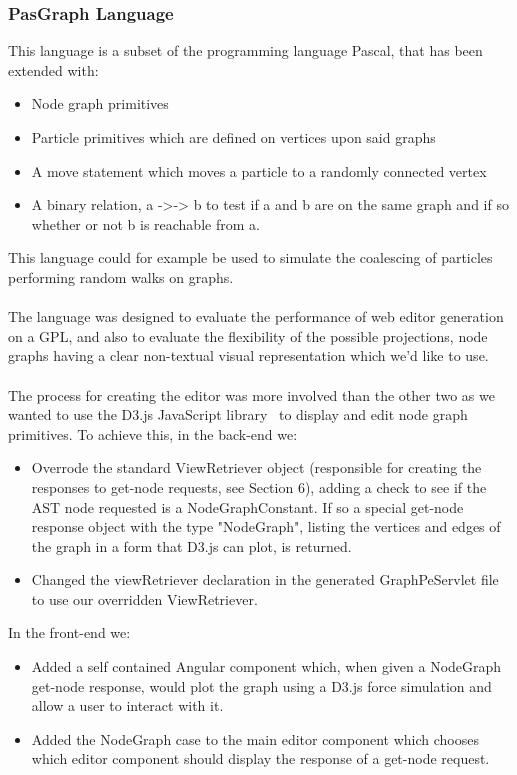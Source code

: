 \documentclass{article}
\begin{document}
{\subsubsection{PasGraph Language}\label{pasgraph}
This language is a subset of the programming language Pascal, that has been extended with: 
\begin{itemize}
\item Node graph primitives
\item Particle primitives which are defined on vertices upon said graphs
\item A move statement which moves a particle to a randomly connected vertex
\item A binary relation, a ->-> b to test if a and b are on the same graph and if so whether or not b is reachable from a.
\end{itemize}
This language could for example be used to simulate the coalescing of particles performing random walks on graphs. 
\\
\\
The language was designed to evaluate the performance of web editor generation on a GPL, and also to evaluate the flexibility of the possible projections, node graphs having a clear non-textual visual representation which we'd like to use.
\\
\\
The process for creating the editor was more involved than the other two as we wanted to use the D3.js JavaScript library~\cite{d3} to display and edit node graph primitives. To achieve this, in the back-end we:
\begin{itemize}
\item Overrode the standard ViewRetriever object (responsible for creating the responses to get-node requests, see Section 6), adding a check to see if the AST node requested is a NodeGraphConstant. If so a special get-node response object with the type "NodeGraph", listing the vertices and edges of the graph in a form that D3.js can plot, is returned. 
\item Changed the viewRetriever declaration in the  generated GraphPeServlet file to use our overridden ViewRetriever.
\end{itemize}
In the front-end we:
\begin{itemize}
\item Added a self contained Angular component which, when given a NodeGraph get-node response, would plot the graph using a D3.js force simulation and allow a user to interact with it.
\item Added the NodeGraph case to the main editor component which chooses which editor component should display the response of a get-node request.

\end{itemize}}
\end{document}
